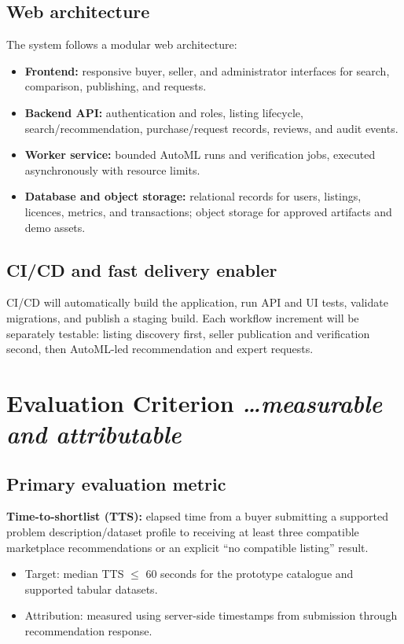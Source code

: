 \documentclass[11pt,a4paper]{article}
\newcommand{\BvrHint}[1]{{\normalfont\normalsize\itshape\hfill #1}}
\begin{document}
\subsection{Web architecture}
The system follows a modular web architecture:
\begin{itemize}[leftmargin=0.7cm]
  \item \textbf{Frontend:} responsive buyer, seller, and administrator interfaces for search, comparison, publishing, and requests.
  \item \textbf{Backend API:} authentication and roles, listing lifecycle, search/recommendation, purchase/request records, reviews, and audit events.
  \item \textbf{Worker service:} bounded AutoML runs and verification jobs, executed asynchronously with resource limits.
  \item \textbf{Database and object storage:} relational records for users, listings, licences, metrics, and transactions; object storage for approved artifacts and demo assets.
\end{itemize}

\subsection{CI/CD and fast delivery enabler}
CI/CD will automatically build the application, run API and UI tests, validate migrations, and publish a staging build. Each workflow increment will be separately testable: listing discovery first, seller publication and verification second, then AutoML-led recommendation and expert requests.

\section{Evaluation Criterion \BvrHint{\ldots measurable and attributable}}
\subsection{Primary evaluation metric}
\textbf{Time-to-shortlist (TTS):} elapsed time from a buyer submitting a supported problem description/dataset profile to receiving at least three compatible marketplace recommendations or an explicit ``no compatible listing'' result.
\begin{itemize}[leftmargin=0.7cm]
  \item Target: median TTS $\leq$ 60 seconds for the prototype catalogue and supported tabular datasets.
  \item Attribution: measured using server-side timestamps from submission through recommendation response.
\end{itemize}
\end{document}
